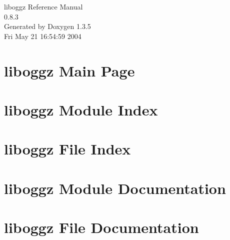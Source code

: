 \documentclass[a4paper]{book}
\begin{document}
\begin{titlepage}
\vspace*{7cm}
\begin{center}
{\Large liboggz Reference Manual\\[1ex]\large 0.8.3 }\\
\vspace*{1cm}
{\large Generated by Doxygen 1.3.5}\\
\vspace*{0.5cm}
{\small Fri May 21 16:54:59 2004}\\
\end{center}
\end{titlepage}
\clearemptydoublepage
{}
\tableofcontents
\clearemptydoublepage
{}
\chapter{liboggz Main Page}
\label{index}
\chapter{liboggz Module Index}

\chapter{liboggz File Index}

\chapter{liboggz Module Documentation}












\chapter{liboggz File Documentation}




\printindex
\end{document}
